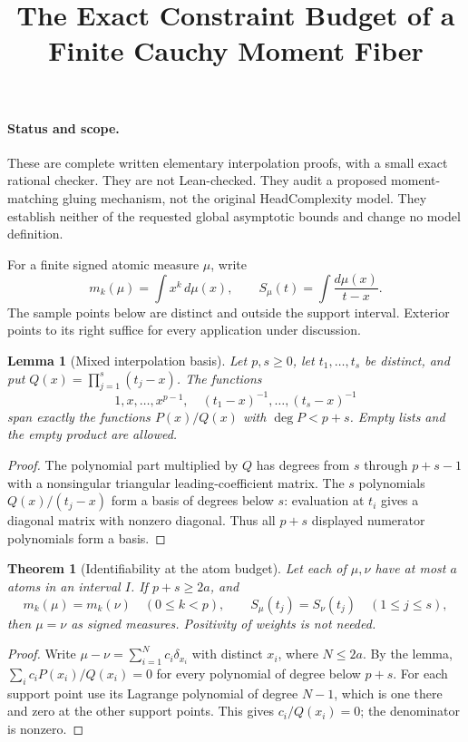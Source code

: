 \documentclass{article}
\newtheorem{theorem}{Theorem}
\newtheorem{lemma}{Lemma}
\begin{document}
\title{The Exact Constraint Budget of a Finite Cauchy Moment Fiber}
\author{}
\date{}
\maketitle

\paragraph{Status and scope.}
These are complete written elementary interpolation proofs, with a small
exact rational checker. They are not Lean-checked. They audit a proposed
moment-matching gluing mechanism, not the original HeadComplexity model.
They establish neither of the requested global asymptotic bounds and
change no model definition.

For a finite signed atomic measure $\mu$, write
\[
 m_k(\mu)=\int x^k\,d\mu(x),\qquad
 S_\mu(t)=\int\frac{d\mu(x)}{t-x}.
\]
The sample points below are distinct and outside the support interval.
Exterior points to its right suffice for every application under discussion.

\begin{lemma}[Mixed interpolation basis]
Let $p,s\geq0$, let $t_1,\ldots,t_s$ be distinct, and put
$Q(x)=\prod_{j=1}^s(t_j-x)$. The functions
\[
 1,x,\ldots,x^{p-1},\quad
 (t_1-x)^{-1},\ldots,(t_s-x)^{-1}
\]
span exactly the functions $P(x)/Q(x)$ with $\deg P<p+s$.
Empty lists and the empty product are allowed.
\end{lemma}
\begin{proof}
The polynomial part multiplied by $Q$ has degrees from $s$ through
$p+s-1$ with a nonsingular triangular leading-coefficient matrix.
The $s$ polynomials $Q(x)/(t_j-x)$ form a basis of degrees below $s$:
evaluation at $t_i$ gives a diagonal matrix with nonzero diagonal.
Thus all $p+s$ displayed numerator polynomials form a basis.
\end{proof}

\begin{theorem}[Identifiability at the atom budget]
Let each of $\mu,\nu$ have at most $a$ atoms in an interval $I$.
If $p+s\geq2a$, and
\[
 m_k(\mu)=m_k(\nu)\quad(0\leq k<p),\qquad
 S_\mu(t_j)=S_\nu(t_j)\quad(1\leq j\leq s),
\]
then $\mu=\nu$ as signed measures. Positivity of weights is not needed.
\end{theorem}
\begin{proof}
Write $\mu-\nu=\sum_{i=1}^N c_i\delta_{x_i}$ with distinct $x_i$,
where $N\leq2a$. By the lemma,
$\sum_i c_i P(x_i)/Q(x_i)=0$ for every polynomial of degree below $p+s$.
For each support point use its Lagrange polynomial of degree $N-1$,
which is one there and zero at the other support points.
This gives $c_i/Q(x_i)=0$; the denominator is nonzero.
\end{proof}
\end{document}
